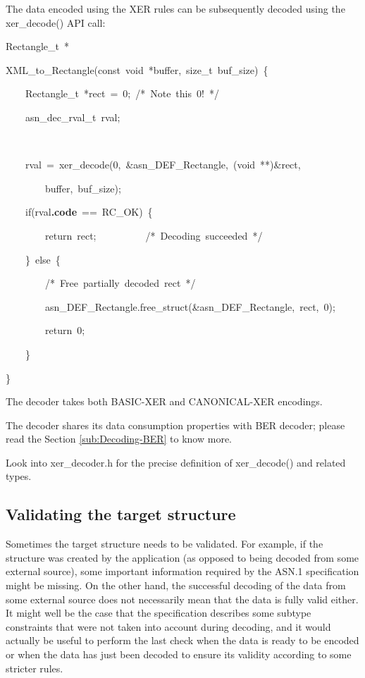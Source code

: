 \documentclass[english,oneside,12pt]{book}
\newenvironment{lyxcode}
{\par\begin{list}{}{
\setlength{\rightmargin}{\leftmargin}
\setlength{\listparindent}{0pt}%
\raggedright
\setlength{\itemsep}{0pt}
\setlength{\parsep}{0pt}
\normalfont\ttfamily}%
 \item[]}
{\end{list}}
\begin{document}
The data encoded using the XER rules can be subsequently decoded using
the xer\_decode() API call:
\begin{lyxcode}
Rectangle\_t~{*}

XML\_to\_Rectangle(const~void~{*}buffer,~size\_t~buf\_size)~\{

~~~~Rectangle\_t~{*}rect~=~0;~/{*}~Note~this~0!~{*}/

~~~~asn\_dec\_rval\_t~rval;

~~

~~~~rval~=~xer\_decode(0,~\&asn\_DEF\_Rectangle,~(void~{*}{*})\&rect,

~~~~~~~~buffer,~buf\_size);

~~~~if(rval\textbf{.code}~==~RC\_OK)~\{

~~~~~~~~return~rect;~~~~~~~~~~/{*}~Decoding~succeeded~{*}/

~~~~\}~else~\{

~~~~~~~~/{*}~Free~partially~decoded~rect~{*}/

~~~~~~~~asn\_DEF\_Rectangle.free\_struct(\&asn\_DEF\_Rectangle,~rect,~0);

~~~~~~~~return~0;

~~~~\}

\}
\end{lyxcode}
The decoder takes both BASIC-XER and CANONICAL-XER encodings.

The decoder shares its data consumption properties with BER decoder;
please read the Section \vref{sub:Decoding-BER} to know more.

Look into xer\_decoder.h for the precise definition of xer\_decode()
and related types.


\subsection{\label{sub:Validating-the-target}Validating the target structure}

Sometimes the target structure needs to be validated. For example,
if the structure was created by the application (as opposed to being
decoded from some external source), some important information required
by the ASN.1 specification might be missing. On the other hand, the
successful decoding of the data from some external source does not
necessarily mean that the data is fully valid either. It might well
be the case that the specification describes some subtype constraints
that were not taken into account during decoding, and it would actually
be useful to perform the last check when the data is ready to be encoded
or when the data has just been decoded to ensure its validity according
to some stricter rules.
\end{document}

